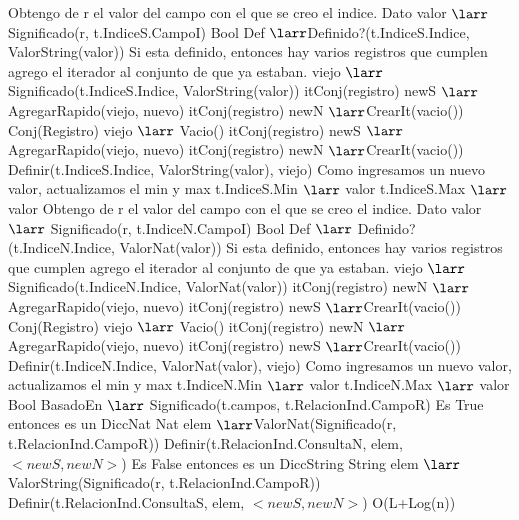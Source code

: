 {			\State Obtengo de r el valor del campo con el que se creo el indice.
			\State Dato valor	$\larr$	Significado(r, t.IndiceS.CampoI) 
			\State Bool Def $\larr$Definido?(t.IndiceS.Indice, ValorString(valor))
			 
				\State	Si esta definido, entonces hay varios registros que cumplen
				\State	agrego el iterador al conjunto de que ya estaban.
				\State viejo $\larr$ Significado(t.IndiceS.Indice, ValorString(valor))
				\State itConj(registro) newS $\larr$AgregarRapido(viejo, nuevo) 
				\State itConj(registro) newN $\larr$CrearIt(vacio())
			\Else
				\State Conj(Registro) viejo $\larr$ Vacio() 
				\State itConj(registro) newS $\larr$AgregarRapido(viejo, nuevo)
				\State itConj(registro) newN $\larr$CrearIt(vacio())
				\State Definir(t.IndiceS.Indice, ValorString(valor), viejo) 
				\State Como ingresamos un nuevo valor, actualizamos el min y max
				 
					\State t.IndiceS.Min $\larr$ valor
				\EndIf
					\State t.IndiceS.Max $\larr$ valor
				\EndIf
			\EndIf			
		\Else
				\State Obtengo de r el valor del campo con el que se creo el indice.
				\State Dato valor $\larr$ Significado(r, t.IndiceN.CampoI) 
				\State Bool Def $\larr$ Definido?(t.IndiceN.Indice, ValorNat(valor))
				 
					\State	Si esta definido, entonces hay varios registros que cumplen
					\State	agrego el iterador al conjunto de que ya estaban.
					\State viejo $\larr$ Significado(t.IndiceN.Indice, ValorNat(valor))
					\State itConj(registro) newN $\larr$AgregarRapido(viejo, nuevo) 
					\State itConj(registro) newS $\larr$CrearIt(vacio())
				\Else
					\State Conj(Registro) viejo $\larr$ Vacio() 
					\State itConj(registro) newN $\larr$AgregarRapido(viejo, nuevo)
					\State itConj(registro) newS $\larr$CrearIt(vacio())
					\State Definir(t.IndiceN.Indice, ValorNat(valor), viejo) 
					\State Como ingresamos un nuevo valor, actualizamos el min y max
					 
						\State t.IndiceN.Min $\larr$ valor
					\EndIf
						\State t.IndiceN.Max $\larr$ valor
					\EndIf
				\EndIf
			\EndIf
		\EndIf
	\EndIf
	\State Bool BasadoEn $\larr$ Significado(t.campos, t.RelacionInd.CampoR)
		\State Es True entonces es un DiccNat
		\State Nat elem $\larr$ValorNat(Significado(r, t.RelacionInd.CampoR))
		\State Definir(t.RelacionInd.ConsultaN, elem, $< newS, newN >$)
	\Else
		\State Es False entonces es un DiccString
		\State String elem $\larr$ValorString(Significado(r, t.RelacionInd.CampoR))
		\State Definir(t.RelacionInd.ConsultaS, elem, $< newS, newN >$)
	\EndIf
}{O(L+Log(n))}
